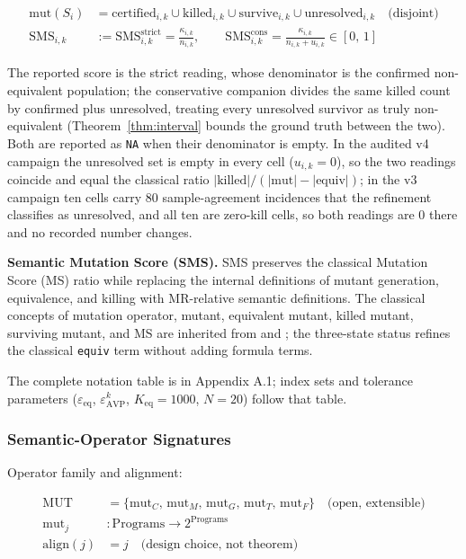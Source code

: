 \documentclass[manuscript,screen,review]{acmart}
\begin{document}
\begin{align*}
\mathrm{mut}(S_i) &= \mathrm{certified}_{i,k} \cup \mathrm{killed}_{i,k} \cup \mathrm{survive}_{i,k} \cup \mathrm{unresolved}_{i,k} \quad \text{(disjoint)} \\
\mathrm{SMS}_{i,k} &:= \mathrm{SMS}^{\mathrm{strict}}_{i,k} = \frac{\kappa_{i,k}}{n_{i,k}}, \qquad
\mathrm{SMS}^{\mathrm{cons}}_{i,k} = \frac{\kappa_{i,k}}{n_{i,k} + u_{i,k}} \in [0,\,1]
\end{align*}

The reported score is the strict reading, whose denominator is the
confirmed non-equivalent population; the conservative companion divides
the same killed count by confirmed plus unresolved, treating every
unresolved survivor as truly non-equivalent
(Theorem~\ref{thm:interval} bounds the ground truth between the two).
Both are reported as \texttt{NA} when their denominator is empty. In the
audited v4 campaign the unresolved set is empty in every cell
($u_{i,k} = 0$), so the two readings coincide and equal the classical
ratio $|\mathrm{killed}|/(|\mathrm{mut}| - |\mathrm{equiv}|)$; in the v3
campaign ten cells carry 80 sample-agreement incidences that the
refinement classifies as unresolved, and all ten are zero-kill cells, so
both readings are $0$ there and no recorded number changes.

\textbf{Semantic Mutation Score (SMS).} SMS preserves the classical
Mutation Score (MS) ratio while replacing the internal definitions of
mutant generation, equivalence, and killing with MR-relative semantic
definitions. The classical concepts of mutation operator, mutant,
equivalent mutant, killed mutant, surviving mutant, and MS are inherited
from \citet{d7c38286734419b52de4262c9802ebdfcf4b9447} and
\citet{ammann2008introduction}; the three-state status refines the
classical \texttt{equiv} term without adding formula terms.

The complete notation table is in Appendix A.1; index sets and tolerance
parameters ($\varepsilon_{\mathrm{eq}}$, $\varepsilon_{\mathrm{AVP}}^k$,
$K_{\mathrm{eq}} = 1000$, $N = 20$) follow that table.

\subsubsection{Semantic-Operator Signatures}\label{operator-signatures}

Operator family and alignment:

\begin{align*}
\mathrm{MUT} &= \{\mathrm{mut}_C,\, \mathrm{mut}_M,\, \mathrm{mut}_G,\, \mathrm{mut}_T,\, \mathrm{mut}_F\} \quad \text{(open, extensible)} \\
\mathrm{mut}_j &: \text{Programs} \to 2^{\text{Programs}} \\
\mathrm{align}(j) &= j \quad \text{(design choice, not theorem)}
\end{align*}
\end{document}
